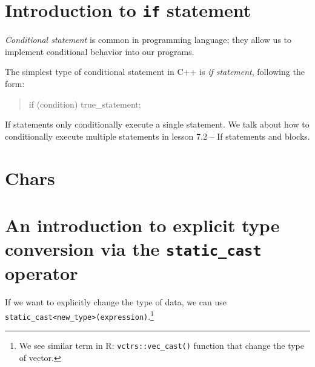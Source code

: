 \documentclass[
  letterpaper,
  DIV=11,
  numbers=noendperiod]{scrreprt}
\begin{document}
\hypertarget{introduction-to-if-statement}{%
\section{\texorpdfstring{Introduction to \texttt{if}
statement}{Introduction to if statement}}\label{introduction-to-if-statement}}

\emph{Conditional statement} is common in programming language; they
allow us to implement conditional behavior into our programs.

The simplest type of conditional statement in C++ is \emph{if
statement}, following the form:

\begin{quote}
if (condition) true\_statement;
\end{quote}

\begin{tcolorbox}[enhanced jigsaw, toprule=.15mm, rightrule=.15mm, opacityback=0, breakable, leftrule=.75mm, colback=white, colframe=quarto-callout-warning-color-frame, arc=.35mm, left=2mm, bottomrule=.15mm]
\begin{minipage}[t]{5.5mm}
\textcolor{quarto-callout-warning-color}{\faExclamationTriangle}
\end{minipage}%
\begin{minipage}[t]{\textwidth - 5.5mm}

If statements only conditionally execute a single statement. We talk
about how to conditionally execute multiple statements in lesson 7.2 --
If statements and blocks.

\end{minipage}%
\end{tcolorbox}

\hypertarget{chars}{%
\section{Chars}\label{chars}}

\hypertarget{an-introduction-to-explicit-type-conversion-via-the-static_cast-operator}{%
\section{\texorpdfstring{An introduction to explicit type conversion via
the \texttt{static\_cast}
operator}{An introduction to explicit type conversion via the static\_cast operator}}\label{an-introduction-to-explicit-type-conversion-via-the-static_cast-operator}}

If we want to explicitly change the type of data, we can use
\texttt{static\_cast\textless{}new\_type\textgreater{}(expression)}.\footnote{We
  see similar term in R: \texttt{vctrs::vec\_cast()} function that
  change the type of vector.}
\end{document}
